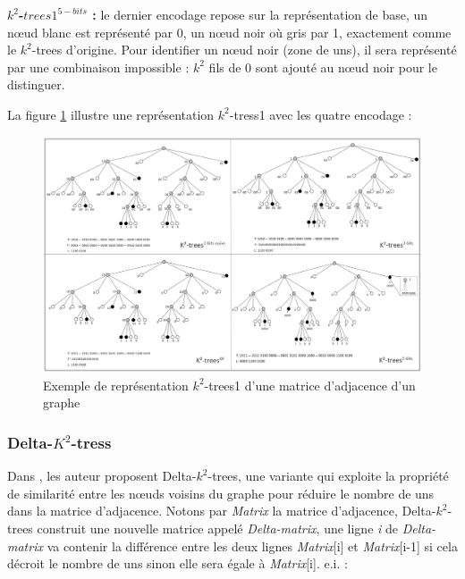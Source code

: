 \textbf{ $k^2$-$trees1^{5-bits}$ :} le dernier encodage repose sur la représentation de base, un nœud blanc est représenté par 0, un nœud noir où gris par 1, exactement comme le $k^2$-trees d'origine. Pour identifier un nœud noir (zone de uns), il sera représenté par une combinaison impossible : $k^2$ fils de 0 sont ajouté au nœud noir pour le distinguer.


La figure \ref{k2-trees1-exemple} illustre une représentation $k^2$-tress1 avec les quatre encodage \citep{de2014new} : 


\begin{figure}[H]
\begin{center}
\includegraphics[height=300 pt, width=450 pt]{./ressources/image/k2-trees1.png} 
\end{center}
\caption{Exemple de représentation $k^2$-trees1 d'une matrice d'adjacence d'un graphe}
\label{k2-trees1-exemple}
\end{figure}


\subsubsection{Delta-$K^2$-tress }

Dans \citep{zhang2014delta}, les auteur proposent Delta-$k^2$-trees, une variante qui exploite la propriété de similarité entre les nœuds voisins du graphe pour réduire le nombre de uns dans la matrice d'adjacence. Notons par \textit{Matrix} la matrice d'adjacence, Delta-$k^2$-trees construit une nouvelle matrice appelé \textit{Delta-matrix}, une ligne \textit{i} de \textit{Delta-matrix} va contenir la différence entre les deux lignes \textit{Matrix}[i] et  \textit{Matrix}[i-1] si cela décroit le nombre de uns sinon elle sera égale à \textit{Matrix}[i]. e.i. : \\


